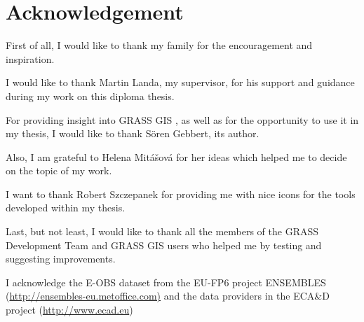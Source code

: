 \chapter*{Acknowledgement}
\thispagestyle{empty}

First of all, I would like to thank my family for the encouragement and inspiration.

I would like to thank Martin Landa, my supervisor, for his support
and guidance during my work on this diploma thesis.

For providing insight into GRASS GIS \tf, as well as
for the opportunity to use it in my thesis, I would like to thank S\"{o}ren Gebbert, its author.

Also, I am grateful to Helena Mitášová for her ideas
which helped me to decide on the topic of my work.

I want to thank Robert Szczepanek for providing me with nice icons for the tools developed within my thesis.

Last, but not least, I would like to thank all the members of the GRASS Development Team and GRASS GIS users
who helped me by testing and suggesting improvements.


I acknowledge the E-OBS dataset from the EU-FP6 project ENSEMBLES
(\url{http://ensembles-eu.metoffice.com)} and the data providers
in the ECA\&D project (\url{http://www.ecad.eu})



